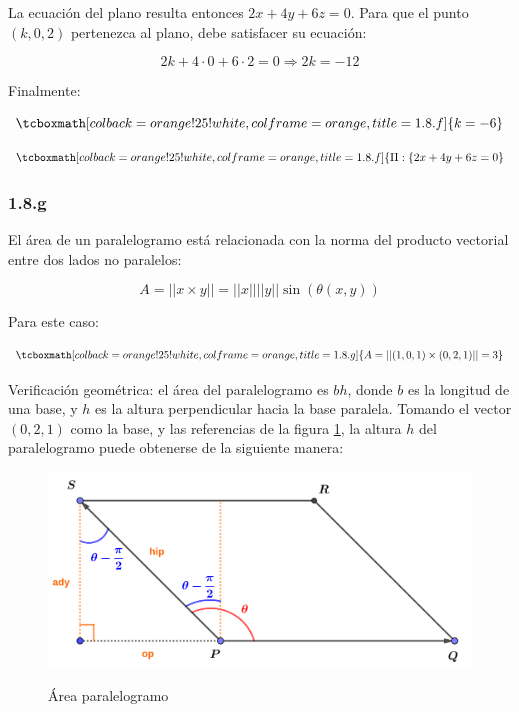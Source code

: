 \documentclass{article}
\begin{document}
La ecuación del plano resulta entonces $2x + 4y + 6z = 0$. Para que el punto $(k, 0, 2)$ pertenezca al plano, debe satisfacer su ecuación:

\begin{equation}
2k + 4 \cdot 0 + 6 \cdot 2 = 0 \Rightarrow 2k = -12
\end{equation}

Finalmente:

\begin{equation}
\tcboxmath[colback=orange!25!white,colframe=orange,title=1.8.f]
{ k = -6 }
\end{equation}

\begin{equation}
\tcboxmath[colback=orange!25!white,colframe=orange,title=1.8.f]
{ \Pi: \{ 2x + 4y + 6z = 0 }
\end{equation}

\subsubsection*{1.8.g}
\label{subsubsec:1.8.g}

El área de un paralelogramo está relacionada con la norma del producto vectorial entre dos lados no paralelos:

\begin{equation}
A = ||x \times y|| = ||x|| ||y|| \sin(\theta(x,y))
\end{equation}

Para este caso:

\begin{equation}
\tcboxmath[colback=orange!25!white,colframe=orange,title=1.8.g]
{ A = ||(1, 0, 1) \times (0, 2, 1)|| = 3 }
\end{equation}

Verificación geométrica: el área del paralelogramo es $b h$, donde $b$ es la longitud de una base, y $h$ es la altura perpendicular hacia la base paralela. Tomando el vector $(0, 2, 1)$ como la base, y las referencias de la figura \ref{fig:1-8-g}, la altura $h$ del paralelogramo puede obtenerse de la siguiente manera:

\begin{figure}[ht]
\caption{Área paralelogramo}
\includegraphics[scale=1]{img/ejercicios/1/8-g.png} 
\centering
\label{fig:1-8-g}
\end{figure}
\end{document}
